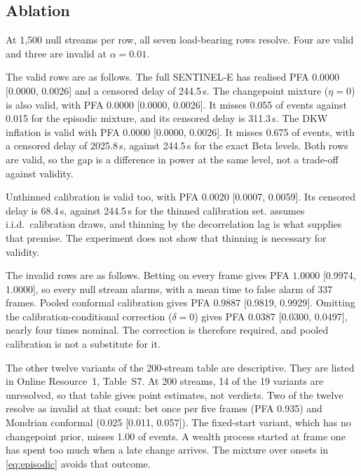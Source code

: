 \subsection{Ablation}
\label{sec:ablation}


At 1,500 null streams per row, all seven load-bearing rows resolve. Four are
valid and three are invalid at $\alpha=0.01$.

The valid rows are as follows. The full SENTINEL-E has realised PFA
$0.0000$ [0.0000, 0.0026] and a censored delay of 244.5\,s. The changepoint
mixture ($\eta=0$) is also valid, with PFA $0.0000$ [0.0000, 0.0026]. It misses
0.055 of events against 0.015 for the episodic mixture, and its censored delay
is 311.3\,s. The DKW inflation is valid with PFA $0.0000$ [0.0000, 0.0026]. It
misses 0.675 of events, with a censored delay of 2025.8\,s, against 244.5\,s for
the exact Beta levels. Both rows are valid, so the gap is a difference in power
at the same level, not a trade-off against validity.

Unthinned calibration is valid too, with PFA $0.0020$ [0.0007, 0.0059]. Its
censored delay is 68.4\,s, against 244.5\,s for the thinned calibration set.
 assumes i.i.d.\ calibration draws, and thinning by the
decorrelation lag is what supplies that premise. The experiment does not show
that thinning is necessary for validity.

The invalid rows are as follows. Betting on every frame gives PFA $1.0000$
[0.9974, 1.0000], so every null stream alarms, with a mean time to false alarm
of 337 frames. Pooled conformal calibration gives PFA $0.9887$ [0.9819, 0.9929].
Omitting the calibration-conditional correction ($\delta=0$) gives PFA
$0.0387$ [0.0300, 0.0497], nearly four times nominal. The correction is therefore required, and pooled calibration is not a substitute for it.

The other twelve variants of the 200-stream table are descriptive. They are
listed in Online Resource~1, Table~S7. At 200 streams, 14 of the 19 variants are
unresolved, so that table gives point estimates, not verdicts. Two of the twelve
resolve as invalid at that count: bet once per five frames (PFA 0.935) and
Mondrian conformal (0.025 [0.011, 0.057]). The fixed-start variant, which has no
changepoint prior, misses 1.00 of events. A wealth process started at frame one
has spent too much when a late change arrives. The mixture over onsets in
\cref{eq:episodic} avoids that outcome.
